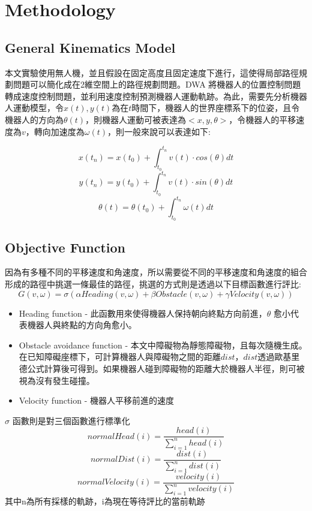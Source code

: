 \documentclass[crop=false]{standalone}
\begin{document}
	\section{Methodology}
	\subsection{General Kinematics Model}
	本文實驗使用無人機，並且假設在固定高度且固定速度下進行，這使得局部路徑規劃問題可以簡化成在2維空間上的路徑規劃問題。DWA 將機器人的位置控制問題轉成速度控制問題，並利用速度控制預測機器人運動軌跡。為此，需要先分析機器人運動模型\cite{fox}，令$x(t), y(t)$為在$t$時間下，機器人的世界座標系下的位姿，且令機器人的方向為$\theta(t)$，則機器人運動可被表達為$<x, y, \theta>$，令機器人的平移速度為$v$，轉向加速度為$\omega(t)$，則一般來說可以表達如下:
	
	\begin{equation}
		x(t_n)=x(t_0)+ \int_{t_0}^{t_n}v(t) \cdot cos(\theta)dt
	\end{equation}
	\begin{equation}
		y(t_n)=y(t_0)+ \int_{t_0}^{t_n}v(t) \cdot sin(\theta)dt
	\end{equation}
	\begin{equation}
		\theta(t)=\theta(t_0)+\int_{t_0}^{t_n}\omega(t)dt
	\end{equation}
	
	
	\subsection{Objective Function}
	因為有多種不同的平移速度和角速度，所以需要從不同的平移速度和角速度的組合形成的路徑中挑選一條最佳的路徑，挑選的方式則是透過以下目標函數進行評比:
	\begin{equation}
		G(v, \omega)=\sigma(\alpha Heading(v, \omega) + \beta Obstacle(v, \omega) + \gamma Velocity(v, \omega))
	\end{equation}
	\begin{itemize}
		\item Heading function - 此函數用來使得機器人保持朝向終點方向前進，$\theta$ 愈小代表機器人與終點的方向角愈小。
		\item Obstacle avoidance function - 本文中障礙物為靜態障礙物，且每次隨機生成。在已知障礙座標下，可計算機器人與障礙物之間的距離$dist$，$dist$透過歐基里德公式計算後可得到。如果機器人碰到障礙物的距離大於機器人半徑，則可被視為沒有發生碰撞。
		\item Velocity function - 機器人平移前進的速度
	\end{itemize}
	$\sigma$ 函數則是對三個函數進行標準化
	\begin{equation}
		normalHead(i)=\frac{head(i)}{\sum_{i=1}^{n}{head(i)}}
	\end{equation}
	\begin{equation}
		normalDist(i)=\frac{dist(i)}{\sum_{i=1}^{n}{dist(i)}}
	\end{equation}
	\begin{equation}
		normalVelocity(i)=\frac{velocity(i)}{\sum_{i=1}^{n}{velocity(i)}}
	\end{equation}
	其中n為所有採樣的軌跡，i為現在等待評比的當前軌跡
\end{document}
